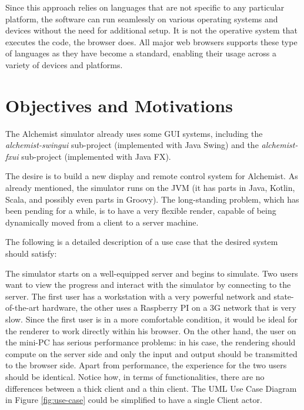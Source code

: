 Since this approach relies on languages that are not specific to any particular platform, the software can run seamlessly on various operating systems and devices without the need for additional setup. It is not the operative system that executes the code, the browser does.
All major web browsers supports these type of languages as they have become a standard, enabling their usage across a variety of devices and platforms.

\section{Objectives and Motivations}
\label{sec:objectives-and-motivations}
The Alchemist simulator already uses some GUI systems, including the \textit{alchemist-swingui} sub-project (implemented with Java Swing) and the \textit{alchemist-fxui} sub-project (implemented with Java FX).\newline

The desire is to build a new display and remote control system for Alchemist. As already mentioned, the simulator runs on the JVM (it has parts in Java, Kotlin, Scala, and possibly even parts in Groovy). The long-standing problem, which has been pending for a while, is to have a very flexible render, capable of being dynamically moved from a client to a server machine.\newline


The following is a detailed description of a use case that the desired system should satisfy:\newline

The simulator starts on a well-equipped server and begins to simulate. Two users want to view the progress and interact with the simulator by connecting to the server. The first user has a workstation with a very powerful network and state-of-the-art hardware, the other uses a Raspberry PI on a 3G network that is very slow. Since the first user is in a more comfortable condition, it would be ideal for the renderer to work directly within his browser. On the other hand, the user on the mini-PC has serious performance problems: in his case, the rendering should compute on the server side and only the input and output should be transmitted to the browser side. Apart from performance, the experience for the two users should be identical. Notice how, in terms of functionalities, there are no differences between a thick client and a thin client. The UML Use Case Diagram in Figure \ref{fig:use-case} could be simplified to have a single Client actor.\newline

